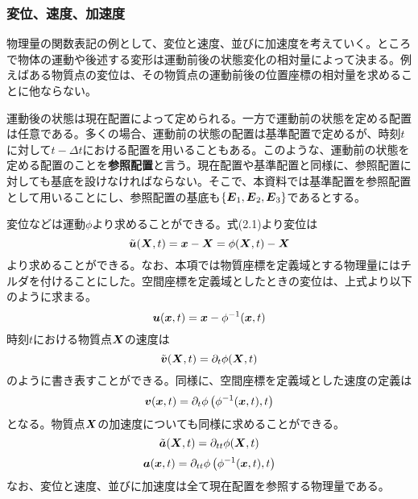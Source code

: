 \documentclass[dvipdfmx, 9pt, a4paper]{jsarticle}
\numberwithin{equation}{section}
\newcommand{\bm}[1]{{\mbox{\boldmath $#1$}}}
\begin{document}
\subsubsection{変位、速度、加速度}
物理量の関数表記の例として、変位と速度、並びに加速度を考えていく。ところで物体の運動や後述する変形は運動前後の状態変化の相対量によって決まる。例えばある物質点の変位は、その物質点の運動前後の位置座標の相対量を求めることに他ならない。\par
運動後の状態は現在配置によって定められる。一方で運動前の状態を定める配置は任意である。多くの場合、運動前の状態の配置は基準配置で定めるが、時刻$t$に対して$t-\Delta t$における配置を用いることもある。このような、運動前の状態を定める配置のことを{\bf 参照配置}と言う。現在配置や基準配置と同様に、参照配置に対しても基底を設けなければならない。そこで、本資料では基準配置を参照配置として用いることにし、参照配置の基底も$\{\bm E_1, \bm E_2, \bm E_3\}$であるとする。\par
変位などは運動$\phi$より求めることができる。式(2.1)より変位は
\begin{equation}
\tilde{\bm u}(\bm X, t)=\bm x - \bm X=\phi(\bm X, t) - \bm X
\end{equation}
より求めることができる。なお、本項では物質座標を定義域とする物理量にはチルダを付けることにした。空間座標を定義域としたときの変位は、上式より以下のように求まる。
\begin{equation}
\bm u(\bm x, t)=\bm x - \phi^{-1}(\bm x, t)
\end{equation}
時刻$t$における物質点$\bm X$の速度は
\begin{equation}
\tilde{\bm v}(\bm X, t)=\partial_t\phi(\bm X, t)
\end{equation}
のように書き表すことができる。同様に、空間座標を定義域とした速度の定義は
\begin{equation}
\bm v(\bm x, t)=\partial_t\phi\left(\phi^{-1}(\bm x, t), t\right)
\end{equation}
となる。物質点$\bm X$の加速度についても同様に求めることができる。
\begin{equation}
\tilde{\bm a}(\bm X, t)=\partial_{tt}\phi(\bm X, t)
\end{equation}
\begin{equation}
\bm a(\bm x, t)=\partial_{tt}\phi\left(\phi^{-1}(\bm x, t), t\right)
\end{equation}
なお、変位と速度、並びに加速度は全て現在配置を参照する物理量である。
\end{document}
